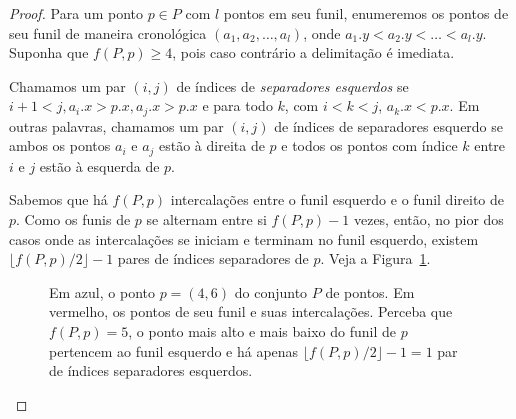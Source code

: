 \begin{proof} \label{lema:passo-intermediario}
    Para um ponto $p \in P$ com $l$ pontos em seu funil, enumeremos os pontos de seu funil de maneira cronológica $(a_1,a_2,\ldots,a_l)$, onde $a_1.y < a_2.y < \ldots < a_l.y$. Suponha que $f(P,p) \geq 4$, pois caso contrário a delimitação é imediata.

    Chamamos um par $(i,j)$ de índices de \textit{separadores esquerdos} se $i + 1 < j, a_i.x > p.x, a_j.x > p.x$ e para todo $k$, com $i < k < j$, $a_k.x < p.x$. Em outras palavras, chamamos um par $(i,j)$ de índices de separadores esquerdo se ambos os pontos $a_i$ e $a_j$ estão à direita de $p$ e todos os pontos com índice $k$ entre $i$ e $j$ estão à esquerda de $p$.

    Sabemos que há $f(P,p)$ intercalações entre o funil esquerdo e o funil direito de $p$. Como os funis de $p$ se alternam entre si $f(P,p) -1$ vezes, então, no pior dos casos onde as intercalações se iniciam e terminam no funil esquerdo, existem  $\lfloor f(P,p)/2 \rfloor - 1$ pares de índices separadores de $p$. Veja a Figura~\ref{fig:bound-z-rets}.

    \begin{figure}
        \caption{Em azul, o ponto $p = (4,6)$ do conjunto $P$ de pontos. Em vermelho, os pontos de seu funil e suas intercalações. Perceba que $f(P,p) = 5$, o ponto mais alto e mais baixo do funil de $p$ pertencem ao funil esquerdo e há apenas $\lfloor f(P,p)/2 \rfloor - 1 = 1$ par de índices separadores esquerdos.}
    \label{fig:bound-z-rets}
    \end{figure}


\end{proof}
